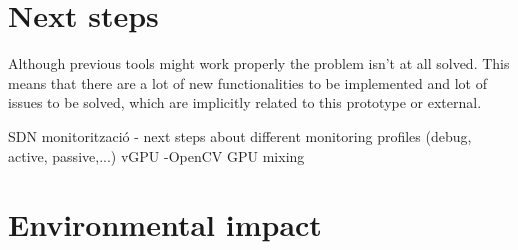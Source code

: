 \section{Next steps}

Although previous tools might work properly the problem isn't at all solved. This means that there are a lot of new functionalities to be implemented and lot of issues to be solved, which are implicitly related to this prototype or external.




SDN
monitorització - next steps about different monitoring profiles (debug, active, passive,...)
vGPU -OpenCV GPU mixing

\section{Environmental impact}



